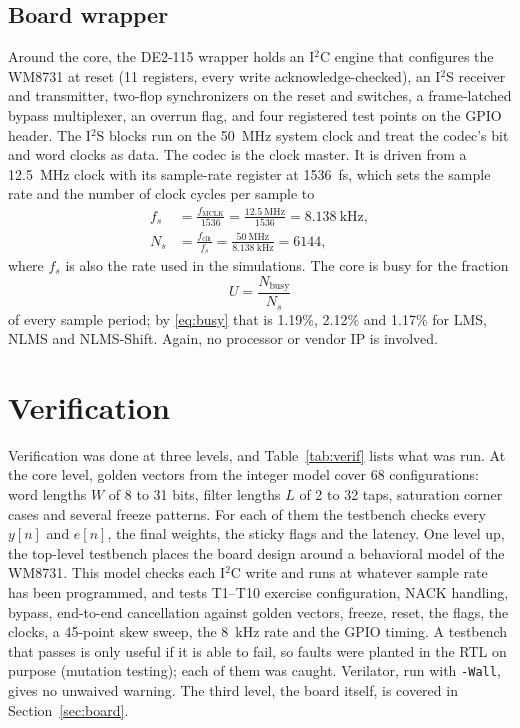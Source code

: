 \subsection{Board wrapper}
Around the core, the DE2-115 wrapper holds an I$^2$C engine that configures the WM8731 at reset (11
registers, every write acknowledge-checked), an I$^2$S receiver and transmitter, two-flop synchronizers on
the reset and switches, a frame-latched bypass multiplexer, an overrun flag, and four registered test
points on the GPIO header. The I$^2$S blocks run on the 50~MHz system clock and treat the codec's bit and
word clocks as data. The codec is the clock master. It is driven from a 12.5~MHz clock with its
sample-rate register at 1536~fs, which sets the sample rate and the number of clock cycles per sample to
\begin{align}
f_s &= \frac{f_{\text{MCLK}}}{1536}=\frac{12.5~\text{MHz}}{1536}=8.138~\text{kHz}, \label{eq:fs}\\
N_s &= \frac{f_{\text{clk}}}{f_s}=\frac{50~\text{MHz}}{8.138~\text{kHz}}=6144, \label{eq:ns}
\end{align}
where $f_s$ is also the rate used in the simulations. The core is busy for the fraction
\begin{equation}
U=\frac{N_{\text{busy}}}{N_s}
\label{eq:util}
\end{equation}
of every sample period; by \eqref{eq:busy} that is 1.19\%, 2.12\% and 1.17\% for LMS, NLMS and
NLMS-Shift. Again, no processor or vendor IP is involved.

\section{Verification}\label{sec:verif}
Verification was done at three levels, and Table~\ref{tab:verif} lists what was run. At the core level,
golden vectors from the integer model cover 68 configurations: word lengths $W$ of 8 to 31 bits, filter
lengths $L$ of 2 to 32 taps, saturation corner cases and several freeze patterns. For each of them the
testbench checks every $y[n]$ and $e[n]$, the final weights, the sticky flags and the latency. One level
up, the top-level testbench places the board design around a behavioral model of the WM8731. This model
checks each I$^2$C write and runs at whatever sample rate has been programmed, and tests T1--T10 exercise
configuration, NACK handling, bypass, end-to-end cancellation against golden vectors, freeze, reset, the
flags, the clocks, a 45-point skew sweep, the 8~kHz rate and the GPIO timing. A testbench that passes is
only useful if it is able to fail, so faults were planted in the RTL on purpose (mutation testing); each
of them was caught. Verilator, run with \texttt{-Wall}, gives no unwaived warning. The third level, the
board itself, is covered in Section~\ref{sec:board}.

